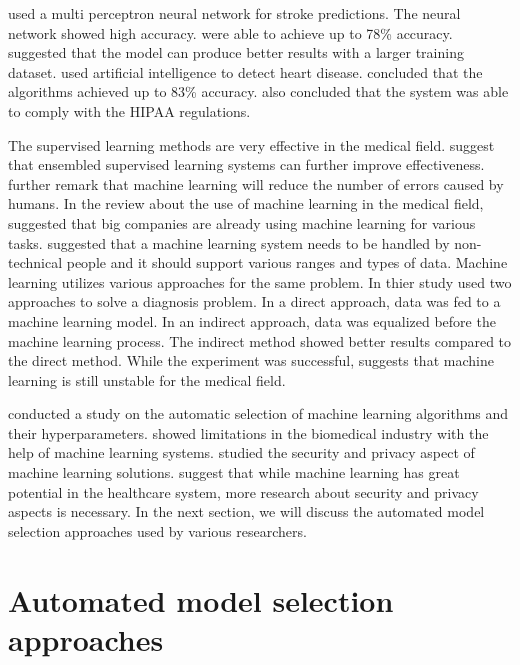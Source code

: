 \cite{ref_paper_42} used a multi perceptron neural network for stroke predictions. The neural network showed high accuracy. \cite{ref_paper_42} were able to achieve up to 78\% accuracy. \cite{ref_paper_42} suggested that the model can produce better results with a larger training dataset. \cite{ref_paper_41} used artificial intelligence to detect heart disease. \cite{ref_paper_41} concluded that the algorithms achieved up to 83\% accuracy. \cite{ref_paper_41} also concluded that the system was able to comply with the HIPAA regulations.

The supervised learning methods are very effective in the medical field. \cite{ref_paper_11} suggest that ensembled supervised learning systems can further improve effectiveness. \cite{ref_paper_11} further remark that machine learning will reduce the number of errors caused by humans. In the review about the use of machine learning in the medical field, \cite{ref_paper_33} suggested that big companies are already using machine learning for various tasks. \cite{ref_paper_33} suggested that a machine learning system needs to be handled by non-technical people and it should support various ranges and types of data. Machine learning utilizes various approaches for the same problem. In thier study \cite{ref_paper_8} used two approaches to solve a diagnosis problem. In a direct approach, data was fed to a machine learning model. In an indirect approach, data was equalized before the machine learning process. The indirect method showed better results compared to the direct method. While the experiment was successful, \cite{ref_paper_8} suggests that machine learning is still unstable for the medical field.

\cite{ref_paper_32} conducted a study on the automatic selection of machine learning algorithms and their hyperparameters. \cite{ref_paper_32} showed limitations in the biomedical industry with the help of machine learning systems. \cite{ref_paper_37} studied the security and privacy aspect of machine learning solutions. \cite{ref_paper_37} suggest that while machine learning has great potential in the healthcare system, more research about security and privacy aspects is necessary. In the next section, we will discuss the automated model selection approaches used by various researchers.

\section{Automated model selection approaches} \label{sec:automated_model_selection_approaches}

